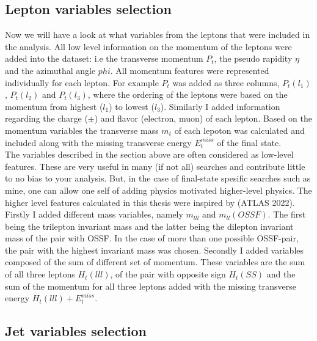 \subsection{Lepton variables selection}
Now we will have a look at what variables from the leptons that were included in the analysis. All low level information on the
momentum of the leptons were added into the dataset: i.e the transverse momentum $P_t$, the pseudo rapidity $\eta$ and the azimuthal
angle $phi$. All momentum features were represented individually for each lepton. For example $P_t$ was added as three columns, $P_t(l_1)$,
$P_t(l_2)$ and $P_t(l_3)$, where the ordering of the leptons were based on the momentum from highest ($l_1$) to lowest ($l_3$).
Similarly I added information regarding the charge ($\pm$) and flavor (electron, muon) of each lepton. Based on the momentum variables
the transverse mass $m_t$ of each lepoton was calculated and included along with the missing transverse energy $E_t^{miss}$ of the 
final state.
\\
The variables described in the section above are often considered as low-level features. These are very useful in many (if not all)
searches and contribute little to no bias to your analysis. But, in the case of final-state spesific searches such as mine,
one can allow one self of adding physics motivated higher-level physics. The higher level features calculated in this thesis
were inspired by \cite{franchini_search_2019} (ATLAS 2022). 
\\
Firstly I added different mass variables, namely $m_{lll}$ and $m_{ll}(OSSF)$. The first being the trilepton invariant mass 
and the latter being the dilepton invariant mass of the pair with OSSF. In the case of more than one possible OSSF-pair,
the pair with the highest invariant mass was chosen. Secondly I added variables composed of the sum of different set of momentum.
These variables are the sum of all three leptons $H_t(lll)$, of the pair with opposite sign $H_t(SS)$ and the sum of the momentum
for all three leptons added with the missing transverse energy $H_t(lll) + E_t^{miss}$.
\subsection{Jet variables selection}
